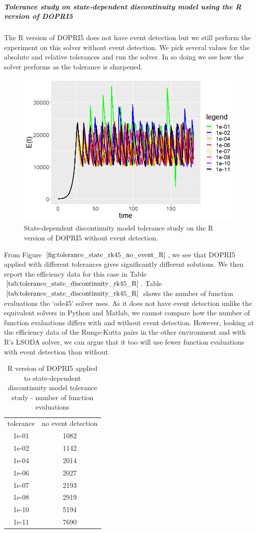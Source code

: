 \subparagraph{Tolerance study on state-dependent discontinuity model using the R version of DOPRI5}
The R version of DOPRI5 does not have event detection but we still perform the experiment on this solver without event detection. We pick several values for the absolute and relative tolerances and run the solver. In so doing we see how the solver performs as the tolerance is sharpened. 

\begin{figure}[h]
\centering
\includegraphics[width=0.7\linewidth]{./figures/tolerance_state_rk45_no_event_R}
\caption{State-dependent discontinuity model tolerance study on the R version of DOPRI5 without event detection.}
\label{fig:tolerance_state_rk45_no_event_R}
\end{figure}

From Figure $\ref{fig:tolerance_state_rk45_no_event_R}$, we see that DOPRI5 applied  with different tolerances gives significantly different solutions. We then report the efficiency data for this case in Table $\ref{tab:tolerance_state_discontinuity_rk45_R}$. Table $\ref{tab:tolerance_state_discontinuity_rk45_R}$ shows the number of function evaluations the `ode45' solver uses. As it does not have event detection unlike the equivalent solvers in Python and Matlab, we cannot compare how the number of function evaluations differs with and without event detection. However, looking at the efficiency data of the Runge-Kutta pairs in the other environment and with R's LSODA solver, we can argue that it too will use fewer function evaluations with event detection than without.

\begin{table}[h]
\caption {R version of DOPRI5 applied to state-dependent discontinuity model tolerance study - number of function evaluations} \label{tab:tolerance_state_discontinuity_rk45_R} 
\begin{center}
\begin{tabular}{ c c }
tolerance & no event detection \\
1e-01 & 1082 \\
1e-02 & 1142 \\
1e-04 & 2014 \\
1e-06 & 2027 \\
1e-07 & 2193 \\
1e-08 & 2919 \\
1e-10 & 5194 \\
1e-11 & 7690 \\
\end{tabular}
\end{center}
\end{table}

